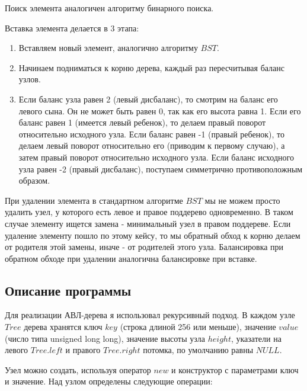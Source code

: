 \documentclass[12pt]{article}
\begin{document}
	Поиск элемента аналогичен алгоритму бинарного поиска.
	
	Вставка элемента делается в 3 этапа:
	\begin{enumerate}
		\item Вставляем новый элемент, аналогично алгоритму $BST$.
		\item Начинаем подниматься к корню дерева, каждый раз пересчитывая баланс узлов.
		\item Если баланс узла равен 2 (левый дисбаланс), то смотрим на баланс его левого сына. Он не может быть равен 0, так как его высота равна 1. Если его баланс равен 1 (имеется левый ребенок), то делаем правый поворот относительно исходного узла. Если баланс равен -1 (правый ребенок), то делаем левый поворот относительно его (приводим к первому случаю), а затем правый поворот относительно исходного узла. Если баланс исходного узла равен -2 (правый дисбаланс), поступаем симметрично противоположным образом.
	\end{enumerate}
	
	При удалении элемента в стандартном алгоритме $BST$ мы не можем просто удалить узел, у которого есть левое и правое поддерево одновременно. В таком случае элементу ищется замена - минимальный узел в правом поддереве. Если удаление элементу пошло по этому кейсу, то мы обратный обход к корню делаем от родителя этой замены, иначе - от родителей этого узла. Балансировка при обратном обходе при удалении аналогична балансировке при вставке.
	
	\subsection*{Описание программы}
	
	\textbf{}
	
	Для реализации АВЛ-дерева я использовал рекурсивный подход. В каждом узле $Tree$ дерева хранятся ключ $key$ (строка длиной 256 или меньше), значение $value$ (число типа unsigned long long), значение высоты узла $height$, указатели на левого $Tree.left$ и правого $Tree.right$ потомка, по умолчанию равны $NULL$.
	
	Узел можно создать, используя оператор $new$ и конструктор с параметрами ключ и значение. Над узлом определены следующие операции:
	
\end{document}
